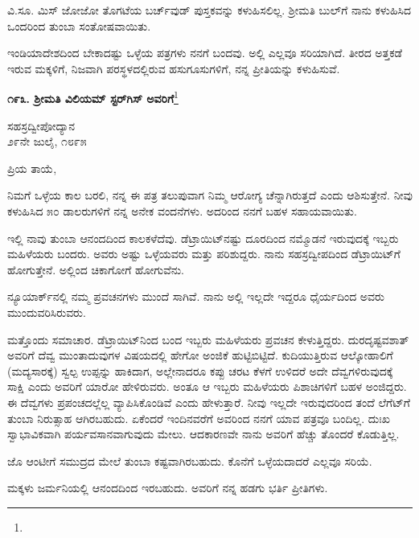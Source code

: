 ವಿ.ಸೂ.\enginline{-} ಮಿಸ್ ಜೋಜೋ ತೊಗಟೆಯ ಬರ್ಚ್‌ವುಡ್ ಪುಸ್ತಕವನ್ನು ಕಳುಹಿಸಲಿಲ್ಲ. ಶ‍್ರೀಮತಿ ಬುಲ್‌ಗೆ ನಾನು ಕಳುಹಿಸಿದ ಒಂದರಿಂದ ತುಂಬಾ ಸಂತೋಷವಾಯಿತು.

ಇಂಡಿಯಾದೇಶದಿಂದ ಬೇಕಾದಷ್ಟು ಒಳ್ಳೆಯ ಪತ್ರಗಳು ನನಗೆ ಬಂದವು. ಅಲ್ಲಿ ಎಲ್ಲವೂ ಸರಿಯಾಗಿದೆ. ತೀರದ ಅತ್ತಕಡೆ ಇರುವ ಮಕ್ಕಳಿಗೆ, ನಿಜವಾಗಿ ಪರಸ್ಥಳದಲ್ಲಿರುವ ಹಸುಗೂಸುಗಳಿಗೆ, ನನ್ನ ಪ್ರೀತಿಯನ್ನು ಕಳುಹಿಸುವೆ.

\begin{center}
\textbf{೧೯೩. ಶ‍್ರೀಮತಿ ವಿಲಿಯಮ್ ಸ್ಟರ್‌ಗಿಸ್ ಅವರಿಗೆ}\footnote{}
\end{center}

\begin{flushright}
ಸಹಸ್ರದ್ವೀಪೋದ್ಯಾನ\\೨೯ನೇ ಜುಲೈ, ೧೮೯೫
\end{flushright}

\noindent
ಪ್ರಿಯ ತಾಯೆ,

ನಿಮಗೆ ಒಳ್ಳೆಯ ಕಾಲ ಬರಲಿ, ನನ್ನ ಈ ಪತ್ರ ತಲುಪುವಾಗ ನಿಮ್ಮ ಆರೋಗ್ಯ ಚೆನ್ನಾಗಿರುತ್ತದೆ ಎಂದು ಆಶಿಸುತ್ತೇನೆ. ನೀವು ಕಳುಹಿಸಿದ ೫೦ ಡಾಲರುಗಳಿಗೆ ನನ್ನ ಅನೇಕ ವಂದನೆಗಳು. ಅದರಿಂದ ನನಗೆ ಬಹಳ ಸಹಾಯವಾಯಿತು.
\vspace{0.2cm}

ಇಲ್ಲಿ ನಾವು ತುಂಬಾ ಆನಂದದಿಂದ ಕಾಲಕಳೆದೆವು. ಡೆಟ್ರಾಯಿಟ್‌ನಷ್ಟು ದೂರದಿಂದ ನಮ್ಮೊಡನೆ ಇರುವುದಕ್ಕೆ ಇಬ್ಬರು ಮಹಿಳೆಯರು ಬಂದರು. ಅವರು ಅಷ್ಟು ಒಳ್ಳೆಯವರು ಮತ್ತು ಪರಿಶುದ್ದರು. ನಾನು ಸಹಸ್ರದ್ವೀಪದಿಂದ ಡೆಟ್ರಾಯಿಟ್‌ಗೆ ಹೋಗುತ್ತೇನೆ. ಅಲ್ಲಿಂದ ಚಿಕಾಗೋಗೆ ಹೋಗುವೆನು.
\vspace{0.2cm}

ನ್ಯೂಯಾರ್ಕ್‌ನಲ್ಲಿ ನಮ್ಮ ಪ್ರವಚನಗಳು ಮುಂದೆ ಸಾಗಿವೆ. ನಾನು ಅಲ್ಲಿ ಇಲ್ಲದೇ ಇದ್ದರೂ ಧೈರ್ಯದಿಂದ ಅವರು ಮುಂದುವರಿಸಿರುವರು.
\vspace{0.2cm}

ಮತ್ತೊಂದು ಸಮಾಚಾರ. ಡೆಟ್ರಾಯಿಟ್‌ನಿಂದ ಬಂದ ಇಬ್ಬರು ಮಹಿಳೆಯರು ಪ್ರವಚನ ಕೇಳುತ್ತಿದ್ದರು. ದುರದೃಷ್ಟವಶಾತ್ ಅವರಿಗೆ ದೆವ್ವ ಮುಂತಾದುವುಗಳ ವಿಷಯದಲ್ಲಿ ಹೇಗೋ ಅಂಜಿಕೆ ಹುಟ್ಟಿಬಿಟ್ಟಿದೆ. ಕುದಿಯುತ್ತಿರುವ ಆಲ್ಕೋಹಾಲಿಗೆ (ಮದ್ಯಸಾರಕ್ಕೆ) ಸ್ವಲ್ಪ ಉಪ್ಪನ್ನು ಹಾಕಿದಾಗ, ಅಲ್ಲೇನಾದರೂ ಕಪ್ಪು ಚರಟ ಕೆಳಗೆ ಉಳಿದರೆ ಅದೇ ದೆವ್ವಗಳಿರುವುದಕ್ಕೆ ಸಾಕ್ಷಿ ಎಂದು ಅವರಿಗೆ ಯಾರೋ ಹೇಳಿರುವರು. ಅಂತೂ ಆ ಇಬ್ಬರು ಮಹಿಳೆಯರು ಪಿಶಾಚಿಗಳಿಗೆ ಬಹಳ ಅಂಜಿದ್ದರು. ಈ ದೆವ್ವಗಳು ಪ್ರಪಂಚದಲ್ಲೆಲ್ಲ ವ್ಯಾಪಿಸಿಕೊಂಡಿವೆ ಎಂದು ಹೇಳುತ್ತಾರೆ. ನೀವು ಇಲ್ಲದೇ ಇರುವುದರಿಂದ ತಂದೆ ಲೆಗೆಟ್‌ಗೆ ತುಂಬಾ ನಿರುತ್ಸಾಹ ಆಗಿರಬಹುದು. ಏಕೆಂದರೆ ಇಂದಿನವರೆಗೆ ಅವರಿಂದ ನನಗೆ ಯಾವ ಪತ್ರವೂ ಬಂದಿಲ್ಲ. ದುಃಖ ಸ್ವಾಭಾವಿಕವಾಗಿ ಪರ್ಯವಸಾನವಾಗುವುದು ಮೇಲು. ಆದಕಾರಣವೇ ನಾನು ಅವರಿಗೆ ಹೆಚ್ಚು ತೊಂದರೆ ಕೊಡುತ್ತಿಲ್ಲ.
\vspace{0.2cm}

ಜೊ ಆಂಟೀಗೆ ಸಮುದ್ರದ ಮೇಲೆ ತುಂಬಾ ಕಷ್ಟವಾಗಿರಬಹುದು. ಕೊನೆಗೆ ಒಳ್ಳೆಯದಾದರೆ ಎಲ್ಲವೂ ಸರಿಯೆ.

ಮಕ್ಕಳು ಜರ್ಮನಿಯಲ್ಲಿ ಆನಂದದಿಂದ ಇರಬಹುದು. ಅವರಿಗೆ ನನ್ನ ಹಡಗು ಭರ್ತಿ ಪ್ರೀತಿಗಳು.

